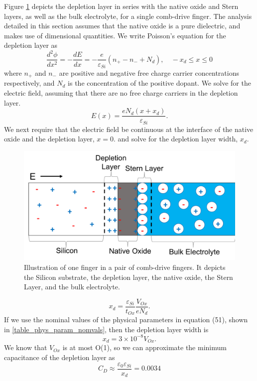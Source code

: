Figure \ref{depletion_layer} depicts the depletion layer in series with the native oxide and Stern layers, as well as the bulk electrolyte, for a single comb-drive finger. The analysis detailed in this section assumes that the native oxide is a pure dielectric, and makes use of dimensional quantities. We write Poisson's equation for the depletion layer as
\begin{equation}
\frac{d^2\phi}{dx^2} = -\frac{dE}{dx} = -\frac{e}{\varepsilon_{Si}}(n_+ - n_- + N_d), \quad -x_d \leq x \leq 0
\end{equation}
where $n_+$ and $n_-$ are positive and negative free charge carrier concentrations respectively, and $N_d$ is the concentration of the positive dopant. We solve for the electric field, assuming that there are no free charge carriers in the depletion layer.
\begin{equation} 
E(x) = \frac{eN_d(x+x_d)}{\varepsilon_{Si}}.
\end{equation}
We next require that the electric field be continuous at the interface of the native oxide and the depletion layer, $x=0$. and solve for the depletion layer width, $x_d$.

\begin{figure}[htpb]
    \begin{center}
    \includegraphics[width=0.7\linewidth]{Chapter3/figure/depletion_layer.png}
    \caption{Illustration of one finger in a pair of comb-drive fingers. It depicts the Silicon substrate, the depletion layer, the native oxide, the Stern Layer, and the bulk electrolyte.}\label{depletion_layer}
    \end{center}
\end{figure}
\begin{equation}
x_d = \frac{\varepsilon_{Si}}{t_{Ox}}\frac{V_{Ox}}{eN_{d}}.
\end{equation}
If we use the nominal values of the physical parameters in equation (51), shown in \ref{table_phys_param_nomvals}, then the depletion layer width is 
\begin{equation}
x_d = 3 \times 10^{-8} V_{Ox}.
\end{equation}
We know that $V_{Ox}$ is at most O(1), so we can approximate the minimum capacitance of the depletion layer as
\begin{equation}
C_{D} \approx \frac{\varepsilon_0 \varepsilon_{Si}}{x_d} = 0.0034 
\end{equation}

